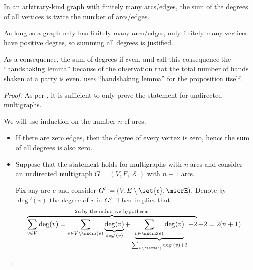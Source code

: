 \begin{proposition}\label{thm:sum_of_graph_degrees}
  In an \hyperref[rem:arbitrary_kind_graph]{arbitrary-kind graph} with finitely many arcs/edges, the sum of the degrees of all vertices is twice the number of arcs/edges.
\end{proposition}
\begin{comments}
  \item As long as a graph only has finitely many arcs/edges, only finitely many vertices have positive degree, so summing all degrees is justified.
  \item As a consequence, the sum of degrees if even.  and  call this consequence the \enquote{handshaking lemma} because of the observation that the total number of hands shaken at a party is even.  uses \enquote{handshaking lemma} for the proposition itself.
\end{comments}
\begin{proof}
  As per , it is sufficient to only prove the statement for undirected multigraphs.

  We will use induction on the number \( n \) of arcs.

  \begin{itemize}
    \item If there are zero edges, then the degree of every vertex is zero, hence the sum of all degrees is also zero.

    \item Suppose that the statement holds for multigraphs with \( n \) arcs and consider an undirected multigraph \( G = (V, E, \mscrE) \) with \( n + 1 \) arcs.

    Fix any arc \( e \) and consider \( G' \coloneqq (V, E \setminus \set{ e }, \mscrE) \). Denote by \( \deg'(v) \) the degree of \( v \) in \( G' \). Then  implies that
    \begin{equation*}
      \overbrace{\sum_{v \in V} \deg(v) = \sum_{v \in V \setminus \mscrE(e)} \underbrace{\deg(v)}_{\deg'(v)} + \underbrace{\sum_{v \in \mscrE(e)} \deg(v)}_{\sum_{v \in \mscrE(e)} \deg'(v) + 2} - 2}^{2n \T*{by the inductive hypothesis}} + 2
      =
      2(n + 1)
    \end{equation*}
  \end{itemize}
\end{proof}

